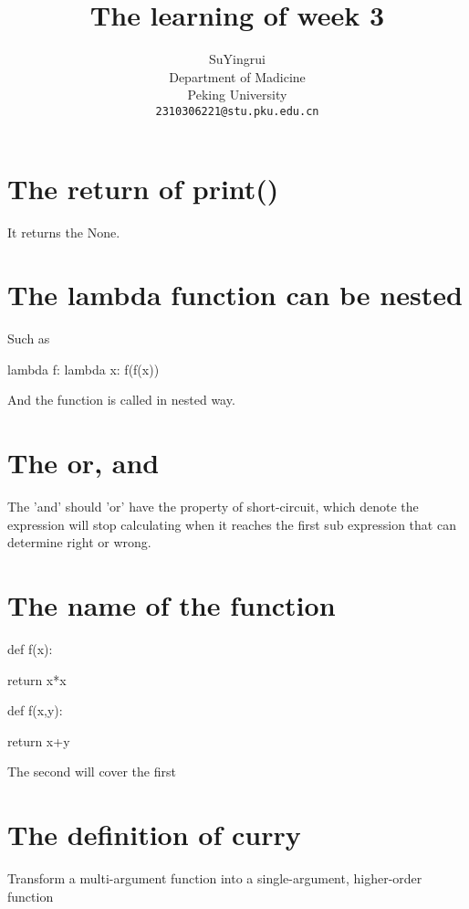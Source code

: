 \documentclass{article}
\title{The learning of week 3}
\author{%
  SuYingrui \\
  Department of Madicine\\
  Peking University\\
  \texttt{2310306221@stu.pku.edu.cn} \\
}
\begin{document}
\maketitle

\section{The return of print()}
It returns the None.

\section{The lambda function can be nested}
Such as 

lambda f: lambda x: f(f(x))

And the function is called in nested way.

\section{The or, and}

The 'and' should 'or' have the property of short-circuit, which denote the expression
will stop calculating when it reaches the first sub expression that can determine right or wrong.

\section{The name of the function}
def f(x):

    return x*x

def f(x,y):

    return x+y

The second will cover the first

\section{The definition of curry}

Transform a multi-argument function into a single-argument, higher-order function
\end{document}
